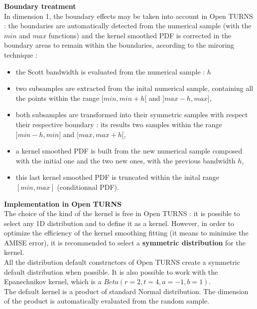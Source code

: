 {  \vspace*{0.5cm}

  \textbf{Boundary treatment}\\


  In dimension 1, the boundary effects may be taken into account in Open TURNS : the boundaries are automatically detected from the numerical sample (with the $min$ and $max$ functions) and the kernel smoothed PDF is corrected in the boundary areas to remain within the boundaries, according to the miroring technique :
  \begin{itemize}
  \item the Scott bandwidth is evaluated from the numerical sample : $h$
  \item two subsamples are extracted from the inital numerical sample, containing all the points within the range $[min, min + h[$ and  $]max-h, max]$,
  \item both subsamples are transformed into their symmetric samples with respect their respective boundary : its results two samples within the range  $]min-h, min]$ and  $[max, max+h[$,
  \item a kernel smoothed PDF is built from the new numerical sample composed with the initial one and the two new ones, with the previous bandwidth $h$,
  \item this last kernel smoothed PDF is truncated within the inital range  $[min, max]$ (conditionnal PDF).
  \end{itemize}



  \vspace*{0.5cm}

  \textbf{Implementation in Open TURNS}\\
  The choice of the kind of the kernel is free in Open TURNS : it is possible to select any 1D distribution and to define it as a kernel. However, in order to optimize the efficiency of the kernel smoothing fitting (it means to minimise the AMISE error), it is recommended to select a {\bf symmetric distribution} for the kernel. \\
  All the distribution default constructors of Open TURNS create a symmetric default distribution when possible. It is also possible to work with the Epanechnikov kernel, which is a $Beta(r=2, t=4, a=-1, b=1)$. \\
  The default kernel is a product of standard Normal distribution. The dimension of the product is automatically evaluated from the random sample.\\

}
